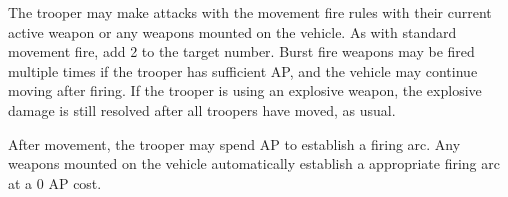 The trooper may make attacks with the movement fire rules with their current active weapon or any weapons mounted on the vehicle.
As with standard movement fire, add 2 to the target number.
Burst fire weapons may be fired multiple times if the trooper has sufficient AP, and the vehicle may continue moving after firing.
If the trooper is using an explosive weapon, the explosive damage is still resolved after all troopers have moved, as usual.

After movement, the trooper may spend AP to establish a firing arc.
Any weapons mounted on the vehicle automatically establish a appropriate firing arc at a 0 AP cost.
